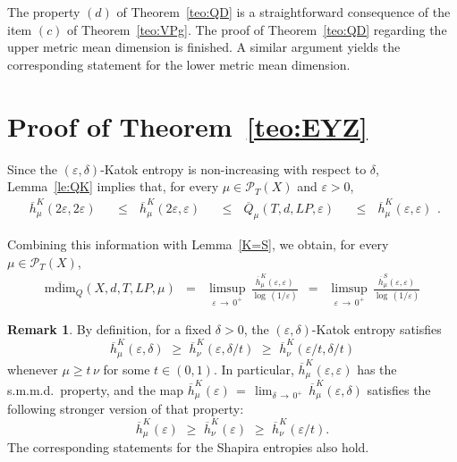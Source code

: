 \documentclass[11pt,a4paper,reqno]{amsart}
\theoremstyle{plain}
\theoremstyle{definition}
\newtheorem{remark}[theorem]{Remark}
\newcommand{\ep} {\varepsilon}
\newcommand{\cP}{{\mathcal P}}
\begin{document}
The property $(d)$ of Theorem~\ref{teo:QD} is a straightforward consequence of the item $(c)$ of Theorem~\ref{teo:VPg}. The proof of Theorem~\ref{teo:QD} regarding the upper metric mean dimension is finished. A similar argument yields the corresponding statement for the lower metric mean dimension.


\section{Proof of Theorem~\ref{teo:EYZ}}\label{se:proofD}

Since the $(\ep,\delta)$-Katok entropy is non-increasing with respect to $\delta$, Lemma~\ref{le:QK} implies that, for every $\mu \in \cP_T(X)$ and $\ep>0$,
\begin{equation*}
    \begin{alignedat}{3}
\overline{h}^K_\mu(2\ep,2\ep)\,\,\,\,&\leq\,\,\,\,\overline{h}^K_\mu(2\ep,\ep)\,\,\,\,&\leq\,\,\,\,\overline{Q}_\mu(T,d,LP,\ep) \,\,\,\,&\leq\,\,\,\, \overline{h}^K_\mu(\ep,\ep) %
    \end{alignedat}.
\end{equation*}

\smallskip

\noindent Combining this information with Lemma~\ref{K=S}, we obtain, for every $\mu\in\cP_T(X)$,
\begin{eqnarray*}
\overline{\mathrm{mdim}}_Q(X,d,T,LP,\mu) &=& 
\limsup_{\ep\,\to\,0^+}\,\frac{\overline{h}^K_\mu(\ep,\ep)}{\log\,(1/\ep)} 
\,\,\,= \,\,\, 
\limsup_{\ep\,\to\,0^+}\,\frac{\overline{h}^S_\mu(\ep,\ep)}{\log\,(1/\ep)} 
\end{eqnarray*}

\medskip

\begin{remark}\label{rem:smmd}
By definition, for a fixed $\delta>0$, the $(\ep,\delta)$-Katok entropy satisfies $$\overline{h}_\mu^K(\ep,\delta)\,\,\geq\,\,\overline{h}_\nu^K(\ep,\delta/t)\,\,\geq\,\,\overline{h}_\nu^K(\ep/t,\delta/t)$$ 
whenever $\mu \geq t\,\nu$ for some $t\in(0,1)$. In particular, $\overline{h}_\mu^K(\ep,\ep)$ has the s.m.m.d.~property, and the map $\overline{h}_\mu^K(\ep)\,=\,\lim_{\delta\,\to\,0^+}\,\overline{h}_\mu^K(\ep,\delta)$ satisfies the following stronger version of that property:
$$\overline{h}_\mu^K(\ep)\,\,\geq\,\,\overline{h}_\nu^K(\ep)\,\,\geq\,\,\overline{h}_\nu^K(\ep/t).$$
The corresponding statements for the Shapira entropies also hold.
\end{remark}
\end{document}
